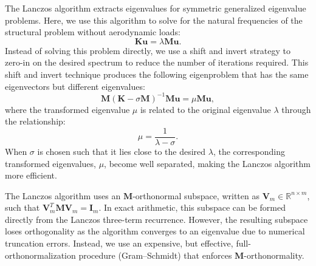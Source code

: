 \documentclass[12pt]{article}
\newcommand{\f}{\frac}
\newcommand{\mb}{\mathbf}
\begin{document}
The Lanczos algorithm extracts eigenvalues for symmetric generalized
eigenvalue problems. Here, we use this algorithm to solve for the
natural frequencies of the structural problem without aerodynamic loads:
%
\begin{equation*}
  \mb{K} \mb{u} = \lambda \mb{M} \mb{u}.
\end{equation*}
%
Instead of solving this problem directly, we use a shift and invert
strategy to zero-in on the desired spectrum to reduce the number of
iterations required. This shift and invert technique produces the
following eigenproblem that has the same eigenvectors but different
eigenvalues:
%
\begin{equation*}
  \mb{M}(\mb{K} - \sigma \mb{M})^{-1}\mb{M} \mb{u} = \mu \mb{M} \mb{u},
\end{equation*}
where the transformed eigenvalue $\mu$ is related to the original eigenvalue
$\lambda$ through the relationship:
%
\begin{equation*}
  \mu = \f{1}{\lambda - \sigma}.
\end{equation*}
When $\sigma$ is chosen such that it lies close to the desired
$\lambda$, the corresponding transformed eigenvalues, $\mu$, become
well separated, making the Lanczos algorithm more efficient.

The Lanczos algorithm uses an $\mb{M}$-orthonormal subspace, written
as $\mb{V}_{m} \in \mathbb{R}^{n \times m}$, such that $\mb{V}_{m}^{T}
\mb{M} \mb{V}_{m} = \mb{I}_{m}$. In exact arithmetic, this subspace
can be formed directly from the Lanczos three-term
recurrence. However, the resulting subspace loses orthogonality as the
algorithm converges to an eigenvalue due to numerical truncation
errors.  Instead, we use an expensive, but effective,
full-orthonormalization procedure (Gram--Schmidt) that enforces
$\mb{M}$-orthonormality.
\end{document}
